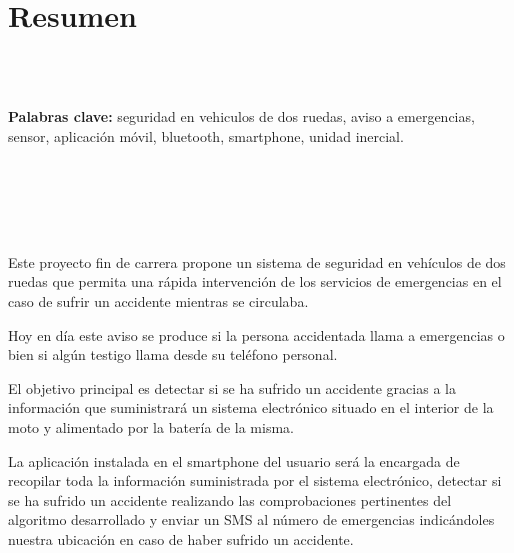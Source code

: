 	\chapter*{Resumen} %
	
	\
	\\
	\
	
	\textbf{Palabras clave:} seguridad en vehiculos de dos ruedas, aviso a emergencias, sensor, aplicaci\'on m\'ovil, bluetooth, smartphone, unidad inercial.
	
	\
	\\
	\\
	\\
	\
	
	
	Este proyecto fin de carrera propone un sistema de seguridad en veh\'iculos de dos ruedas que permita una r\'apida intervenci\'on de los servicios de emergencias en el caso de sufrir un accidente mientras se circulaba.
	
	Hoy en día este aviso se produce si la persona accidentada llama a emergencias o bien si alg\'un testigo llama desde su tel\'efono personal.
	
	El objetivo principal es detectar si se ha sufrido un accidente gracias a la informaci\'on que suministrar\'a un sistema electr\'onico situado en el interior de la moto y alimentado por la bater\'ia de la misma. 
	
	La aplicaci\'on instalada en el smartphone del usuario ser\'a la encargada de recopilar toda la informaci\'on suministrada por el sistema electr\'onico, detectar si se ha sufrido un accidente realizando las comprobaciones pertinentes del algoritmo desarrollado y enviar un SMS al n\'umero de emergencias indic\'andoles nuestra ubicaci\'on en caso de haber sufrido un accidente.
	

	


	\newpage
	$\ $